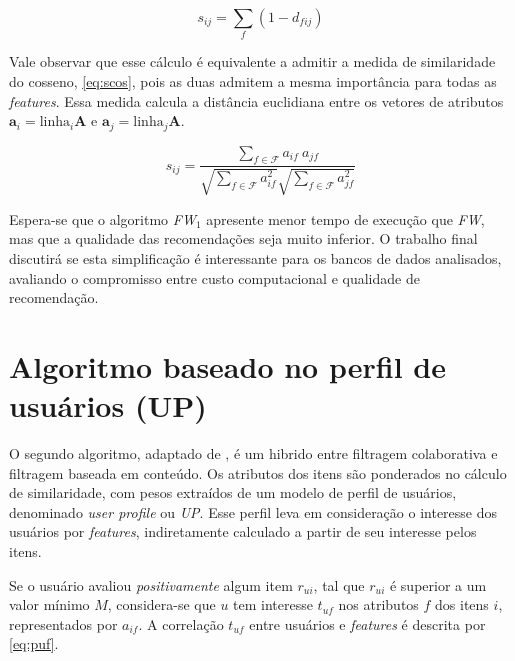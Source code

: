 \begin{equation} 
\label{eq:sij1}
    s_{ij} = \sum_{f}{\left(1-d_{fij}\right)}
\end{equation}

Vale observar que esse cálculo é equivalente a admitir a medida de similaridade do cosseno, \ref{eq:scos}, pois as duas admitem a mesma importância para todas as \textit{features}. Essa medida calcula a distância euclidiana entre os vetores de atributos $\mathbf{a}_i = \mathrm{linha}_i \mathbf{A}$ e $\mathbf{a}_j = \mathrm{linha}_j \mathbf{A}$.

\begin{equation} 
\label{eq:scos}
    s_{ij} = \frac{\sum\limits_{f \in \mathcal{F}}{a_{if}~a_{jf}}}{\sqrt{\sum\limits_{f \in \mathcal{F}}a_{if}^2} \sqrt{\sum\limits_{f \in \mathcal{F}}a_{jf}^2}}
\end{equation}

Espera-se que o algoritmo \textit{FW$_1$} apresente menor tempo de execução que \textit{FW}, mas que a qualidade das recomendações seja muito inferior. O trabalho final discutirá se esta simplificação é interessante para os bancos de dados analisados, avaliando o compromisso entre custo computacional e qualidade de recomendação.


\section{Algoritmo baseado no perfil de usuários (UP)} %
\label{sec:algoritmo_baseado_no_perfil_de_usu_rios_}


O segundo algoritmo, adaptado de \cite{debnath2008feature}, é um hibrido entre filtragem colaborativa e filtragem baseada em conteúdo. Os atributos dos itens são ponderados no cálculo de similaridade, com pesos extraídos de um modelo de perfil de usuários, denominado \textit{user profile} ou \textit{UP}. Esse perfil leva em consideração o interesse dos usuários por \textit{features}, indiretamente calculado a partir de seu interesse pelos itens. 

Se o usuário avaliou \textit{positivamente} algum item $r_{ui}$, tal que $r_{ui}$ é superior a um valor mínimo $M$, considera-se que $u$ tem interesse $t_{uf}$ nos atributos $f$ dos itens $i$, representados por $a_{if}$. A correlação $t_{uf}$ entre usuários e \textit{features} é descrita por \ref{eq:puf}.

